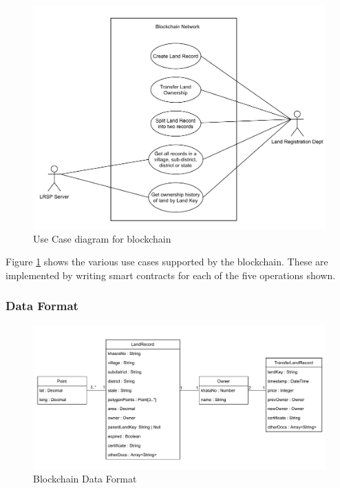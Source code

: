 \documentclass{article}
\begin{document}
        \begin{figure}[htbp]
            \includegraphics[scale=0.25]{blockchain_use_cases}
            \centering
            \caption{Use Case diagram for blockchain}
            \label{fig:bl_use_case}
        \end{figure}

        Figure \ref{fig:bl_use_case} shows the various use cases supported by the blockchain. These are implemented by writing smart contracts for each of the five operations shown.

        \subsubsection{Data Format}
            \begin{figure}[htbp]
                \includegraphics[scale=0.25]{blockchain_data_format}
                \centering
                \caption{Blockchain Data Format}
            \end{figure}
\end{document}
